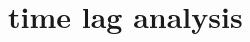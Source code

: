 \documentclass[linenumbers]{aastex631}
\begin{document}









\appendix
\section{time lag analysis}\label{lag_analysis}
\end{document}
